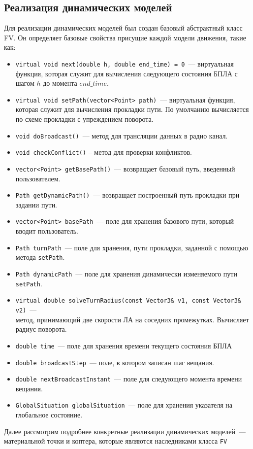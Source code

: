 \documentclass[a4paper,12pt]{article}
\begin{document}
\subsection{Реализация динамических моделей}
Для реализации динамических моделей был создан базовый абстрактный класс FV. Он определяет базовые свойства присущие каждой модели движения, такие как:
\begin{itemize}
    \item     \texttt{virtual void next(double h, double end\_time) = 0}~--- виртуальная функция, которая служит для вычисления следующего состояния БПЛА с шагом $h$ до момента $end\_time$.
    \item \texttt{virtual void setPath(vector<Point> path)}~--- виртуальная функция, которая служит для вычисления прокладки пути. По умолчанию вычисляется по схеме прокладки с упреждением поворота.
    \item \texttt{void doBroadcast()}~--- метод для трансляции данных в радио канал.
    \item \texttt{void checkConflict()} -- метод для проверки конфликтов.
    \item \texttt{vector<Point> getBasePath()}~--- возвращает базовый путь, введенный пользователем.
    \item \texttt{Path getDynamicPath()}~--- возвращает построенный путь прокладки при задании пути.
    \item \texttt{vector<Point> basePath}~--- поле для хранения базового пути, который вводит пользователь.
    \item \texttt{Path turnPath}~--- поле для хранения, пути прокладки, заданной с помощью метода  \texttt{setPath}.
    \item \texttt{Path dynamicPath}~--- поле для хранения динамически изменяемого пути  \texttt{setPath}.
    \item \texttt{virtual double solveTurnRadius(const Vector3\& v1, const Vector3\& v2)}~---\\ метод,  принимающий две скорости ЛА на соседних промежутках. Вычисляет радиус поворота.
    \item \texttt{double time}~--- поле для хранения времени текущего состояния БПЛА
     \item \texttt{double broadсastStep}~--- поле, в котором записан шаг вещания.
      \item \texttt{double nextBroadcastInstant}~--- поле для следующего момента времени вещания.
    \item \texttt{GlobalSituation\* globalSituation}~--- поле для хранения указателя на глобальное состояние.
\end{itemize}
Далее рассмотрим подробнее конкретные реализации динамических моделей~--- материальной точки и коптера, которые являются наследниками класса \texttt{FV}
\end{document}
